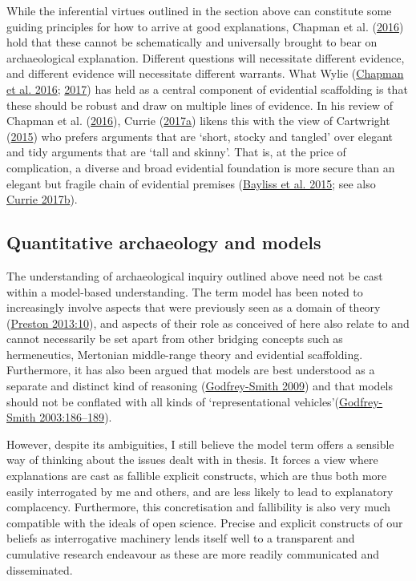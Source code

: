 \documentclass[
  a4paper,
  oneside]{uiophdthesis}
\begin{document}
While the inferential virtues outlined in the section above can constitute some guiding principles for how to arrive at good explanations, Chapman et al. (\protect\hyperlink{ref-chapman2016}{2016}) hold that these cannot be schematically and universally brought to bear on archaeological explanation. Different questions will necessitate different evidence, and different evidence will necessitate different warrants. What Wylie (\protect\hyperlink{ref-chapman2016}{Chapman et al. 2016}; \protect\hyperlink{ref-wylie2017}{2017}) has held as a central component of evidential scaffolding is that these should be robust and draw on multiple lines of evidence. In his review of Chapman et al. (\protect\hyperlink{ref-chapman2016}{2016}), Currie (\protect\hyperlink{ref-currie2017}{2017a}) likens this with the view of Cartwright (\protect\hyperlink{ref-cartwright2015}{2015}) who prefers arguments that are `short, stocky and tangled' over elegant and tidy arguments that are `tall and skinny'. That is, at the price of complication, a diverse and broad evidential foundation is more secure than an elegant but fragile chain of evidential premises (\protect\hyperlink{ref-bayliss2015}{Bayliss et al. 2015}; see also \protect\hyperlink{ref-currie2017a}{Currie 2017b}).

\hypertarget{quantitative-archaeology-and-models}{%
\subsection{Quantitative archaeology and models}\label{quantitative-archaeology-and-models}}

The understanding of archaeological inquiry outlined above need not be cast within a model-based understanding. The term model has been noted to increasingly involve aspects that were previously seen as a domain of theory (\protect\hyperlink{ref-preston2013}{Preston 2013:10}), and aspects of their role as conceived of here also relate to and cannot necessarily be set apart from other bridging concepts such as hermeneutics, Mertonian middle-range theory and evidential scaffolding. Furthermore, it has also been argued that models are best understood as a separate and distinct kind of reasoning (\protect\hyperlink{ref-godfrey-smith2009}{Godfrey-Smith 2009}) and that models should not be conflated with all kinds of `representational vehicles'(\protect\hyperlink{ref-godfrey-smith2003}{Godfrey-Smith 2003:186--189}).

However, despite its ambiguities, I still believe the model term offers a sensible way of thinking about the issues dealt with in thesis. It forces a view where explanations are cast as fallible explicit constructs, which are thus both more easily interrogated by me and others, and are less likely to lead to explanatory complacency. Furthermore, this concretisation and fallibility is also very much compatible with the ideals of open science. Precise and explicit constructs of our beliefs as interrogative machinery lends itself well to a transparent and cumulative research endeavour as these are more readily communicated and disseminated.
\end{document}
